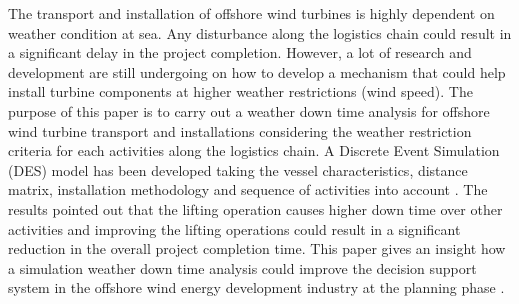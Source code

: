 \begin{Abstract}

The transport and installation of offshore wind turbines is highly dependent on weather condition at sea. Any disturbance along the logistics chain could result in a significant delay in the project completion. However, a lot of research and development are still undergoing on how to develop a mechanism that could help install turbine components at higher weather restrictions (wind speed). The purpose of this paper is to carry out a weather down time analysis for offshore wind turbine transport and installations considering the weather restriction criteria for each activities along the logistics chain. A Discrete Event  Simulation (DES) model has been developed taking the vessel characteristics, distance matrix, installation methodology and sequence of activities into account . The results pointed out that the lifting operation causes higher down time over other activities and improving the lifting operations could result in a significant reduction in the overall project completion time. This paper gives an insight how a simulation weather down time analysis could  improve the decision support system in the offshore wind energy development industry at the planning phase .


\end{Abstract}
  